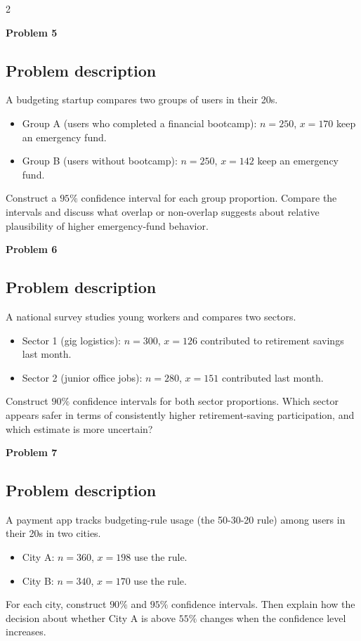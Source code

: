\documentclass[12pt]{article}
\newcommand{\SubsectionBox}[1]{%
\noindent\colorbox{gray!30}{\parbox{\linewidth}{\textbf{#1}}}\par\vspace{0.35cm}%
}
\begin{document}
\begin{multicols}{2}
\vspace{0.5cm}
\SubsectionBox{Problem 5}
\subsection*{Problem description}
A budgeting startup compares two groups of users in their 20s.
\begin{itemize}
  \item Group A (users who completed a financial bootcamp): \(n=250\), \(x=170\) keep an emergency fund.
  \item Group B (users without bootcamp): \(n=250\), \(x=142\) keep an emergency fund.
\end{itemize}
Construct a \(95\%\) confidence interval for each group proportion. Compare the intervals and discuss what overlap or non-overlap suggests about relative plausibility of higher emergency-fund behavior.

\vspace{0.5cm}
\SubsectionBox{Problem 6}
\subsection*{Problem description}
A national survey studies young workers and compares two sectors.
\begin{itemize}
  \item Sector 1 (gig logistics): \(n=300\), \(x=126\) contributed to retirement savings last month.
  \item Sector 2 (junior office jobs): \(n=280\), \(x=151\) contributed last month.
\end{itemize}
Construct \(90\%\) confidence intervals for both sector proportions. Which sector appears safer in terms of consistently higher retirement-saving participation, and which estimate is more uncertain?

\vspace{0.5cm}
\SubsectionBox{Problem 7}
\subsection*{Problem description}
A payment app tracks budgeting-rule usage (the 50-30-20 rule) among users in their 20s in two cities.
\begin{itemize}
  \item City A: \(n=360\), \(x=198\) use the rule.
  \item City B: \(n=340\), \(x=170\) use the rule.
\end{itemize}
For each city, construct \(90\%\) and \(95\%\) confidence intervals. Then explain how the decision about whether City A is above \(55\%\) changes when the confidence level increases.


\end{multicols}
\end{document}
